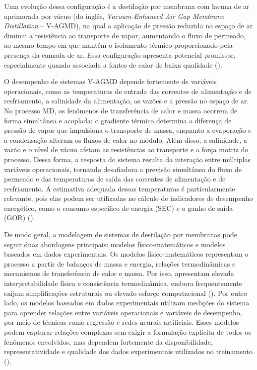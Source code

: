 Uma evolução dessa configuração é a destilação por membrana com lacuna de ar aprimorada por vácuo (do inglês, \textit{Vacuum-Enhanced Air Gap Membrane Distillation} -- V-AGMD), na qual a aplicação de pressão reduzida no espaço de ar diminui a resistência ao transporte de vapor, aumentando o fluxo de permeado, ao mesmo tempo em que mantém o isolamento térmico proporcionado pela presença da camada de ar. Essa configuração apresenta potencial promissor, especialmente quando associada a fontes de calor de baixa qualidade (\cite{Warsinger2017,Zewdie2020}).

O desempenho de sistemas V-AGMD depende fortemente de variáveis operacionais, como as temperaturas de entrada das correntes de alimentação e de resfriamento, a salinidade da alimentação, as vazões e a pressão no espaço de ar. No processo MD, os fenômenos de transferência de calor e massa ocorrem de forma simultânea e acoplada: o gradiente térmico determina a diferença de pressão de vapor que impulsiona o transporte de massa, enquanto a evaporação e a condensação alteram os fluxos de calor no módulo. Além disso, a salinidade, a vazão e o nível de vácuo afetam as resistências ao transporte e a força motriz do processo. Dessa forma, a resposta do sistema resulta da interação entre múltiplas variáveis operacionais, tornando desafiadora a previsão simultânea do fluxo de permeado e das temperaturas de saída das correntes de alimentação e de resfriamento. A estimativa adequada dessas temperaturas é particularmente relevante, pois elas podem ser utilizadas no cálculo de indicadores de desempenho energético, como o consumo específico de energia (SEC) e o ganho de saída (GOR) (\cite{Hitsov2015,Olatunji2018}).

De modo geral, a modelagem de sistemas de destilação por membranas pode seguir duas abordagens principais: modelos físico-matemáticos e modelos baseados em dados experimentais. Os modelos físico-matemáticos representam o processo a partir de balanços de massa e energia, relações termodinâmicas e mecanismos de transferência de calor e massa. Por isso, apresentam elevada interpretabilidade física e consistência termodinâmica, embora frequentemente exijam simplificações estruturais ou elevado esforço computacional (\cite{Hitsov2015,Olatunji2018}). Por outro lado, os modelos baseados em dados experimentais utilizam medições do sistema para aprender relações entre variáveis operacionais e variáveis de desempenho, por meio de técnicas como regressão e redes neurais artificiais. Esses modelos podem capturar relações complexas sem exigir a formulação explícita de todos os fenômenos envolvidos, mas dependem fortemente da disponibilidade, representatividade e qualidade dos dados experimentais utilizados no treinamento (\cite{Zhu2022}).

